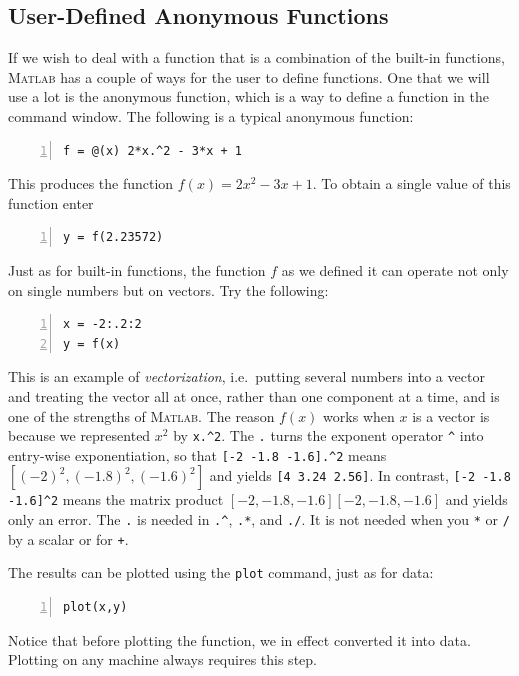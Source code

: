 
\subsection*{User-Defined Anonymous Functions}

If we wish to deal with a function that is a combination of the
built-in functions, \textsc{Matlab} has a couple of ways for the user
to define functions.  One that we will use a lot is the anonymous
function, which is a way to define a function in the command window.
The following is a typical anonymous function:
\begin{lstlisting}[frame=none,numbers=left]
f = @(x) 2*x.^2 - 3*x + 1
\end{lstlisting}
This produces the function $f(x) = 2 x^2 -3x+1$. To obtain a single
value of this function enter
\begin{lstlisting}[frame=none,numbers=left]
y = f(2.23572)
\end{lstlisting}

Just as for built-in functions, the function $f$ as we defined it can
operate
not only on single numbers but on vectors. Try the following:
\begin{lstlisting}[frame=none,numbers=left]
x = -2:.2:2
y = f(x)
\end{lstlisting}
This is an example of {\em vectorization}, i.e.\ putting several
numbers into a vector and treating the vector all at once, rather than
one component at a time, and is one of the strengths of
\textsc{Matlab}.  The reason $f(x)$ works when $x$ is a vector is
because we represented $x^2$ by \verb&x.^2&. The \verb&.& turns the
exponent operator \verb&^& into entry-wise exponentiation, so that
\verb&[-2 -1.8 -1.6].^2& means $[(-2)^2, (-1.8)^2, (-1.6)^2]$ and
yields \verb&[4 3.24 2.56]&.  In contrast, \verb&[-2 -1.8 -1.6]^2&
means the matrix product $[-2, -1.8,-1.6][-2, -1.8,-1.6]$ and yields
only an error. The \verb&.& is needed in \verb&.^&, \verb&.*&, and
\verb&./&. It is not needed when you \verb&*& or \verb&/& by a scalar
or for \verb&+&.

The results can be plotted using the \verb&plot& command, just as for data:
\begin{lstlisting}[frame=none,numbers=left]
plot(x,y)
\end{lstlisting}
Notice that before plotting the function, we in effect converted it
into data. Plotting on any machine always requires this step.



